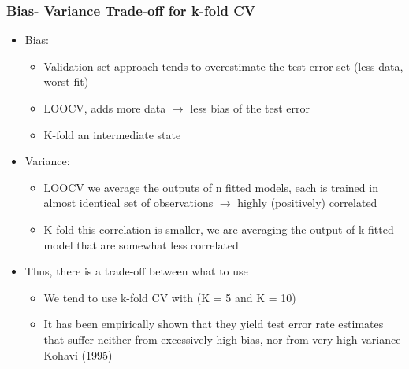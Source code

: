 \documentclass[
  shownotes,
  xcolor={svgnames},
  hyperref={colorlinks,citecolor=DarkBlue,linkcolor=DarkRed,urlcolor=DarkBlue}
  , aspectratio=169]{beamer}
\begin{document}
\begin{frame}[fragile]
\frametitle{Bias- Variance Trade-off for k-fold CV}

\begin{itemize}
  \item Bias:
  \medskip
    \begin{itemize}
      \item Validation set approach tends to overestimate the test error set (less data, worst fit)
      \item LOOCV, adds more data $\rightarrow$ less bias of the test error
      \item K-fold an intermediate state
    \end{itemize}
    \item Variance:
    \begin{itemize}
      \item LOOCV we average the outputs of n fitted models, each is trained in almost identical set of observations $\rightarrow$ highly (positively) correlated
      \item K-fold this correlation is smaller, we are averaging the output of k fitted model that are somewhat less correlated
    \end{itemize}
    \medskip
  \item Thus, there is a trade-off between what to use
  \medskip
    \begin{itemize}
      \item We tend to use k-fold CV with (K = 5 and K = 10)
      \item It has been empirically shown that they yield test error rate estimates that suffer neither from excessively high bias, nor from very high variance Kohavi (1995)
    \end{itemize}
\end{itemize}


\end{frame}
\end{document}
